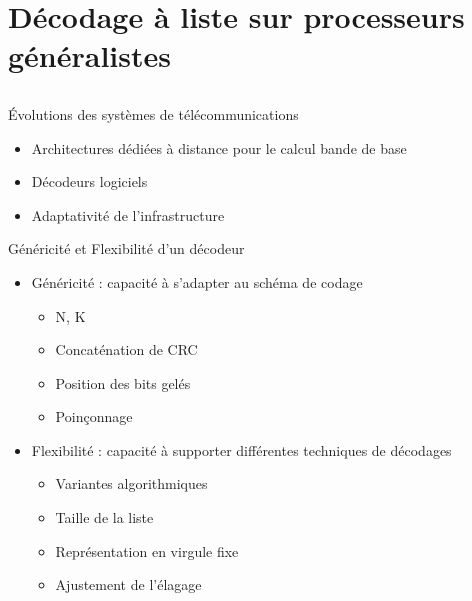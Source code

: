 \section[Décodeur logiciel à liste]{Décodage à liste sur processeurs généralistes}
\subsection*{}

\begin{frame}[c]{\'Evolutions des systèmes de télécommunications}
	\begin{itemize}
		\item Architectures dédiées à distance pour le calcul bande de base
		\item Décodeurs logiciels
		\item Adaptativité de l'infrastructure
	\end{itemize}
\end{frame}


\begin{frame}[c]{Généricité et Flexibilité d'un décodeur}
  \vfill
	\begin{itemize}
		\item Généricité : capacité à s'adapter au schéma de codage
		\begin{itemize}
			\item N, K
			\item Concaténation de CRC
			\item Position des bits gelés
			\item Poinçonnage
		\end{itemize}
    \vfill
		\item Flexibilité : capacité à supporter différentes techniques de décodages
		\begin{itemize}
			\item Variantes algorithmiques
			\item Taille de la liste
			\item Représentation en virgule fixe
			\item Ajustement de l'élagage
		\end{itemize}
	\end{itemize}
  \vfill
\end{frame}



